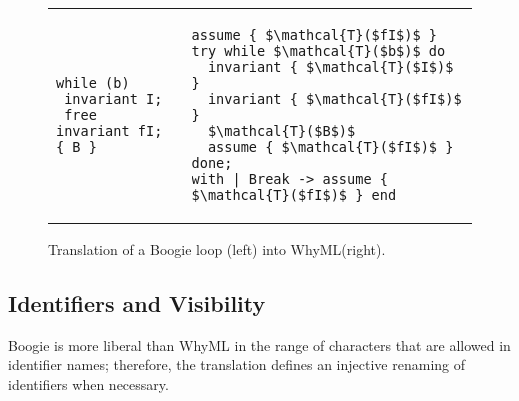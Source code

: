\documentclass[a4paper,final]{llncs}
\makeatletter
\newif\iflong
\newcommand{\tr}{\mathcal{T}}
\newcommand{\des}{\mathcal{D}}
\DeclareRobustCommand{\openCurl}{\ensuremath{\text{\ttfamily\{}}}
\DeclareRobustCommand{\closeCurl}{\ensuremath{\text{\ttfamily\}}}}
\newcommand{\Boogie}{Boogie\xspace}
\newcommand{\WhyML}{WhyML\xspace}
\newcommand{\Why}{Why3\xspace}
\newcommand{\tightParagraph}[1]{\paragraph{#1}}
\newcommand\tightParagraph{\@startsection{paragraph}{4}{\z@}{-5\p@ \@plus -4\p@ \@minus -4\p@}{-0.5em \@plus -0.22em \@minus -0.1em}{\normalfont\normalsize\itshape}}
\newcommand{\feature}[1]{\subsection{#1}}
\makeatother
\begin{document}
\begin{figure}
\lstset{xleftmargin=4mm}
\centering
\footnotesize
\begin{tabular}{m{} m{}}
{\begin{lstlisting}[language=boogie]
while (b)
 invariant I;
 free invariant fI;
{ B }
\end{lstlisting}} &
{\begin{lstlisting}[language=Why3]
assume { $\tr($fI$)$ }
try while $\tr($b$)$ do
  invariant { $\tr($I$)$ }
  invariant { $\tr($fI$)$ }
  $\tr($B$)$
  assume { $\tr($fI$)$ }
done;
with | Break -> assume { $\tr($fI$)$ } end
\end{lstlisting}}
\end{tabular}
\caption{Translation of a \Boogie loop (left) into \WhyML (right).}
\label{fig:tr-loops-while}
\end{figure}


\iflong
\tightParagraph{Procedure calls.}
The translation of procedure calls is straightforward; for \Boogie procedure \B{p} in \autoref{fig:tr-procedures}:
$
\tr(\MB{call r := p(e)}) \ =\ 
\tr(\MW{t})\;\MW{ <- p(}\tr(\MW{e})\MW{)}
$.
Since \WhyML function calls  translating \Boogie procedures use the \W{val} style of declaration rather than the recursive function style (\W{rec}), the modular semantics of procedure calls (where the behavior is entirely determined by the specification) is correctly preserved.
\fi

\iflong
\tightParagraph{Call-forall.}
$\tr$ translates call-forall statements (supported in older versions of \Boogie~\cite{BoogieManual}) by axiomatizing their semantics:
\begin{center}
\B{$\des($\\cforall $\;$Lemma(*)$)\ =\ $}\B{ assume (forall t: T :: R$($t$)$ ==> E$($t$)$)}
\end{center}
where \B{Lemma} is declared as \B{procedure Lemma(t: T) requires R$($t$)$; ensures E$($t$)$}.
\fi

\iflong
\feature{Attributes}
$\tr$ translates \emph{triggers} using \WhyML's syntax: 
\begin{center}
\B{$\tr($forall x: X :: $\;\openCurl$trig$\closeCurl\;$ E(x)$) =\ $}\W{forall x: $\tr($X$)$ [$\tr($trig$)$]. $\tr($E(x)$)$}
\end{center}
The translation discards other application-specific attributes, which have no equivalent in \Why.
\fi

\iflong
\feature{Identifiers and Visibility}
\Boogie is more liberal than \WhyML in the range of characters that are allowed in identifier names; therefore, the translation defines an injective renaming of identifiers when necessary.
\end{document}
